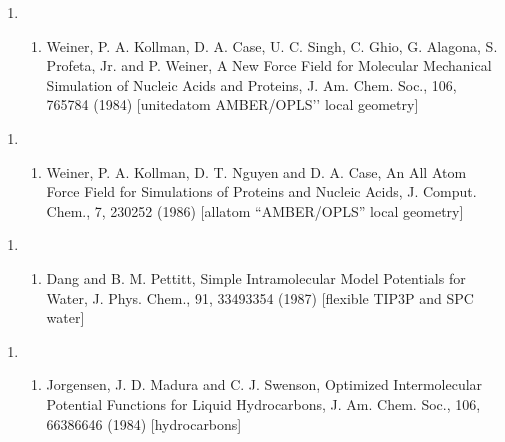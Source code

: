 \documentclass[letterpaper,11pt,english]{sphinxmanual}
\begin{document}
\begin{enumerate}
%
\setcounter{enumi}{18}
\item {} \begin{enumerate}
%
\setcounter{enumii}{9}
\item {} 
Weiner, P. A. Kollman, D. A. Case, U. C. Singh, C. Ghio, G. Alagona, S. Profeta, Jr. and P. Weiner, A New Force Field for Molecular Mechanical Simulation of Nucleic Acids and Proteins, J. Am. Chem. Soc., 106, 765\sphinxhyphen{}784 (1984)  {[}united\sphinxhyphen{}atom {\color{red}\bfseries{}\textasciigrave{}\textasciigrave{}}AMBER/OPLS’’ local geometry{]}

\end{enumerate}

\end{enumerate}
\begin{enumerate}
%
\setcounter{enumi}{18}
\item {} \begin{enumerate}
%
\setcounter{enumii}{9}
\item {} 
Weiner, P. A. Kollman, D. T. Nguyen and D. A. Case, An All Atom Force Field for Simulations of Proteins and Nucleic Acids, J. Comput. Chem., 7, 230\sphinxhyphen{}252 (1986)  {[}all\sphinxhyphen{}atom “AMBER/OPLS” local geometry{]}

\end{enumerate}

\end{enumerate}
\begin{enumerate}
%
\setcounter{enumi}{11}
\item {} \begin{enumerate}
%
\setcounter{enumii}{23}
\item {} 
Dang and B. M. Pettitt, Simple Intramolecular Model Potentials for Water, J. Phys. Chem., 91, 3349\sphinxhyphen{}3354 (1987)  {[}flexible TIP3P and SPC water{]}

\end{enumerate}

\end{enumerate}
\begin{enumerate}
%
\setcounter{enumi}{22}
\item {} \begin{enumerate}
%
\setcounter{enumii}{11}
\item {} 
Jorgensen, J. D. Madura and C. J. Swenson, Optimized Intermolecular Potential Functions for Liquid Hydrocarbons, J. Am. Chem. Soc., 106, 6638\sphinxhyphen{}6646 (1984)  {[}hydrocarbons{]}

\end{enumerate}

\end{enumerate}
\end{document}
